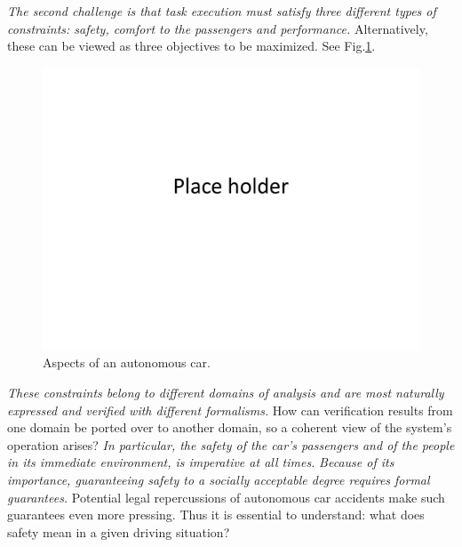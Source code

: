{\it The second challenge is that task execution must satisfy three different types of constraints: safety, comfort to the passengers and performance.}
Alternatively, these can be viewed as three objectives to be maximized.
See Fig.\ref{fig:aspects}.
\begin{figure}[tb]
	\centering
	\includegraphics{figures/placeHolder}
	\caption{Aspects of an autonomous car.}
	\label{fig:aspects}
\end{figure}
\emph{These constraints belong to different domains of analysis and are most naturally expressed and verified with different formalisms.}
How can verification results from one domain be ported over to another domain, so a coherent view of the system's operation arises?
{\it In particular, the safety of the car's passengers and of the people in its immediate environment, is imperative at all times.}
{\it Because of its importance, guaranteeing safety to a socially acceptable degree requires formal guarantees.}
Potential legal repercussions of autonomous car accidents make such guarantees even more pressing.
Thus it is essential to understand: what does safety mean in a given driving situation?

